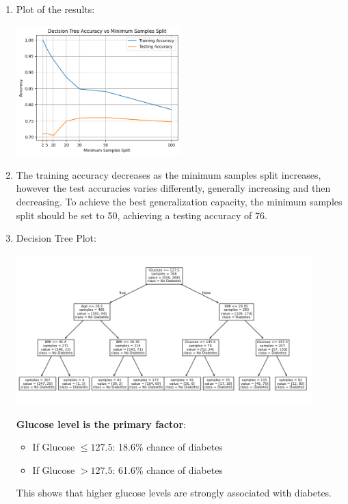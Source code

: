 \documentclass{article}
\begin{document}
\begin{enumerate}[leftmargin=\labelsep]
\vfill

\item Plot of the results:
\begin{center}
    \includegraphics[width=0.5\textwidth]{img/tree_acc_vs_split.png} 
\end{center}

\vfill

\item The training accuracy decreases as the minimum samples split 
increases, however the test accuracies varies differently, generally
increasing and then decreasing. To achieve the best generalization
capacity, the minimum samples split should be set to 50, achieving a
testing accuracy of 76.%

\vfill
\newpage

\item Decision Tree Plot:
    \begin{center}
        \includegraphics[width=0.9\textwidth]{img/tree_plot.png} 
    \end{center}

    \textbf{Glucose level is the primary factor}:
    \begin{itemize}
        \item If Glucose $\leq 127.5$: 18.6\% chance of diabetes
        \item If Glucose $> 127.5$: 61.6\% chance of diabetes
    \end{itemize}
    This shows that higher glucose levels are strongly associated with diabetes.


\end{enumerate}
\end{document}
